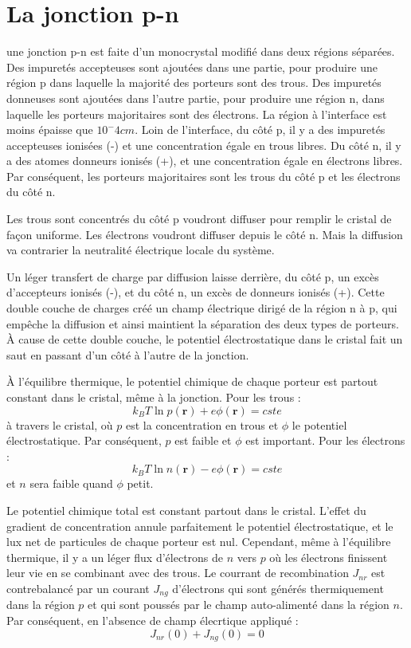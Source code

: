 \chapter{La jonction p-n}

une jonction p-n est faite d'un monocrystal modifié dans deux régions séparées.
Des impuretés accepteuses sont ajoutées dans une partie, pour produire une région
p dans laquelle la majorité des porteurs sont des trous. Des impuretés donneuses
sont ajoutées dans l'autre partie, pour produire une région n, dans laquelle les
porteurs majoritaires sont des électrons. La région à l'interface est moins
épaisse que $10^-4 cm$. Loin de l'interface, du côté p, il y a des impuretés
accepteuses ionisées (-) et une concentration égale en trous libres. Du côté n,
il y a des atomes donneurs ionisés (+), et une concentration égale en électrons
libres. Par conséquent, les porteurs majoritaires sont les trous du côté p et les
électrons du côté n.

Les trous sont concentrés du côté p voudront diffuser pour remplir le cristal de
façon uniforme. Les électrons voudront diffuser depuis le côté n. Mais la
diffusion va contrarier la neutralité électrique locale du système.

Un léger transfert de charge par diffusion laisse derrière, du côté p, un excès
d'accepteurs ionisés (-), et du côté n, un excès de donneurs ionisés (+). Cette
double couche de charges créé un champ électrique dirigé de la région n à p, qui
empêche la diffusion et ainsi maintient la séparation des deux types de porteurs.
À cause de cette double couche, le potentiel électrostatique dans le cristal fait
un saut en passant d'un côté à l'autre de la jonction.

À l'équilibre thermique, le potentiel chimique de chaque porteur est partout
constant dans le cristal, même à la jonction. Pour les trous :
\begin{equation}
    k_BT \ln p(\mathbf{r}) + e\phi(\mathbf{r}) = cste
\end{equation}
à travers le cristal, où $p$ est la concentration en trous et $\phi$ le potentiel
électrostatique. Par conséquent, $p$ est faible et $\phi$ est important. Pour les
électrons :
\begin{equation}
    k_BT \ln n(\mathbf{r}) - e\phi(\mathbf{r}) = cste
\end{equation}
et $n$ sera faible quand $\phi$ petit.

Le potentiel chimique total est constant partout dans le cristal. L'effet du
gradient de concentration annule parfaitement le potentiel électrostatique, et le
lux net de particules de chaque porteur est nul. Cependant, même à l'équilibre
thermique, il y a un léger flux d'électrons de $n$ vers $p$ où les électrons
finissent leur vie en se combinant avec des trous. Le courrant de recombination
$J_{nr}$ est contrebalancé par un courant $J_{ng}$ d'électrons qui sont générés
thermiquement dans la région $p$ et qui sont poussés par le champ auto-alimenté
dans la région $n$. Par conséquent, en l'absence de champ élecrtique appliqué :
\begin{equation}
    J_{nr}(0) + J_{ng}(0) = 0
\end{equation}

